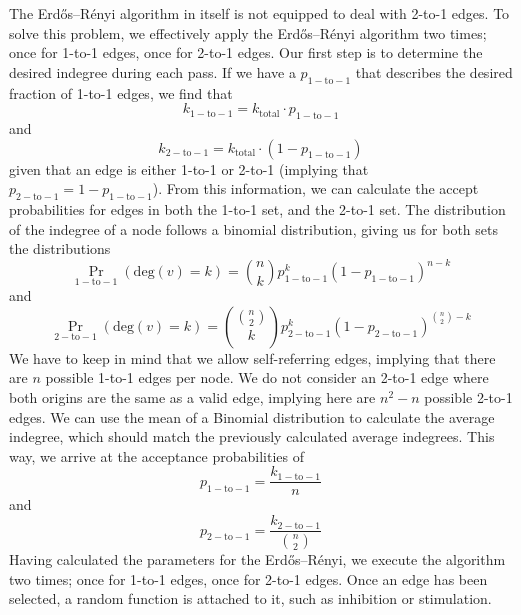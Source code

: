 \documentclass[../main.tex]{subfiles}
\begin{document}
The Erdős–Rényi algorithm in itself is not equipped to deal with 2-to-1 edges.
To solve this problem, we effectively apply the Erdős–Rényi algorithm two times; once for 1-to-1 edges, once for 2-to-1 edges.
Our first step is to determine the desired indegree during each pass.
If we have a $p_\mathrm{1-to-1}$ that describes the desired fraction of 1-to-1 edges, we find that
%
\begin{equation}
k_\mathrm{1-to-1} = k_\mathrm{total} \cdot p_\mathrm{1-to-1}
\end{equation}
%
and
%
\begin{equation}
k_\mathrm{2-to-1} = k_\mathrm{total} \cdot (1 - p_\mathrm{1-to-1})
\end{equation}
%
given that an edge is either 1-to-1 or 2-to-1 (implying that $p_\mathrm{2-to-1} = 1 -  p_\mathrm{1-to-1}$).
From this information, we can calculate the accept probabilities for edges in both the 1-to-1 set, and the 2-to-1 set.
The distribution of the indegree of a node follows a binomial distribution, giving us for both sets the distributions
%
\begin{equation}
\Pr_\mathrm{1-to-1} \left( \mathrm{deg}(v) = k \right) = \binom{n}{k} p_\mathrm{1-to-1}^k (1 - p_\mathrm{1-to-1})^{n-k}
\end{equation}
%
and
%
\begin{equation}
\Pr_\mathrm{2-to-1} \left( \mathrm{deg}(v) = k\right) = \binom{\binom{n}{2}}{k} p_\mathrm{2-to-1}^k (1 - p_\mathrm{2-to-1})^{\binom{n}{2} - k}
\end{equation}
%
We have to keep in mind that we allow self-referring edges, implying that there are $n$ possible 1-to-1 edges per node.
We do not consider an 2-to-1 edge where both origins are the same as a valid edge, implying here are $n^2 - n$ possible 2-to-1 edges.
We can use the mean of a Binomial distribution to calculate the average indegree, which should match the previously calculated average indegrees.
This way, we arrive at the acceptance probabilities of
%
\begin{equation}
p_\mathrm{1-to-1} = \frac{k_\mathrm{1-to-1}}{n}
\end{equation}
%
and
%
\begin{equation}
p_\mathrm{2-to-1} = \frac{k_\mathrm{2-to-1}}{\binom{n}{2}}
\end{equation}
%
Having calculated the parameters for the Erdős–Rényi, we execute the algorithm two times; once for 1-to-1 edges, once for 2-to-1 edges.
Once an edge has been selected, a random function is attached to it, such as inhibition or stimulation.
\end{document}

